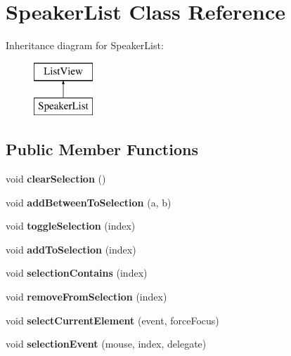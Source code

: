 \hypertarget{classSpeakerList}{\section{Speaker\-List Class Reference}
\label{classSpeakerList}
}
Inheritance diagram for Speaker\-List\-:\begin{figure}[H]
\begin{center}
\leavevmode
\includegraphics[height=2.000000cm]{classSpeakerList}
\end{center}
\end{figure}
\subsection*{Public Member Functions}
\begin{DoxyCompactItemize}
\item 
\hypertarget{classSpeakerList_acc93fae1ea562472a8786779a468b1a7}{void {\bfseries clear\-Selection} ()}\label{classSpeakerList_acc93fae1ea562472a8786779a468b1a7}

\item 
\hypertarget{classSpeakerList_accdfc9a4a5618a4cdf1542aff03b2951}{void {\bfseries add\-Between\-To\-Selection} (a, b)}\label{classSpeakerList_accdfc9a4a5618a4cdf1542aff03b2951}

\item 
\hypertarget{classSpeakerList_ab09c25267d412ccae58cf307b778cba8}{void {\bfseries toggle\-Selection} (index)}\label{classSpeakerList_ab09c25267d412ccae58cf307b778cba8}

\item 
\hypertarget{classSpeakerList_aa52606d08ffd7d4b3a8420f29b234b77}{void {\bfseries add\-To\-Selection} (index)}\label{classSpeakerList_aa52606d08ffd7d4b3a8420f29b234b77}

\item 
\hypertarget{classSpeakerList_aa8b9882f352863ddcf4fb9679decb30e}{void {\bfseries selection\-Contains} (index)}\label{classSpeakerList_aa8b9882f352863ddcf4fb9679decb30e}

\item 
\hypertarget{classSpeakerList_a153cb3c5302699333d0b9f55c877b985}{void {\bfseries remove\-From\-Selection} (index)}\label{classSpeakerList_a153cb3c5302699333d0b9f55c877b985}

\item 
\hypertarget{classSpeakerList_a53fdfda0940f37c71bad8c5a050df4dc}{void {\bfseries select\-Current\-Element} (event, force\-Focus)}\label{classSpeakerList_a53fdfda0940f37c71bad8c5a050df4dc}

\item 
\hypertarget{classSpeakerList_a515bd2b87e3fe64dc44f75f07366ba69}{void {\bfseries selection\-Event} (mouse, index, delegate)}\label{classSpeakerList_a515bd2b87e3fe64dc44f75f07366ba69}

\end{DoxyCompactItemize}
